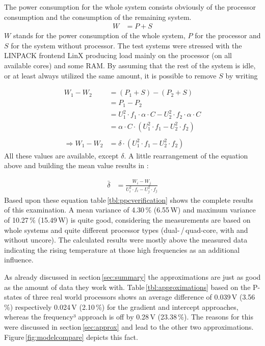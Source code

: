 The power consumption for the whole system consists obviously of the processor consumption and the consumption of the remaining system.
%
\begin{align*}
W &= P + S
\end{align*}
%
$W$ stands for the power consumption of the whole system, $P$ for the processor and $S$ for the system without processor. The test systems were stressed with the LINPACK frontend LinX producing load mainly on the processor (on all available cores) and some RAM. By assuming that the rest of the system is idle, or at least always utilized the same amount, it is possible to remove $S$ by writing

%
\begin{align*}
W_1 - W_2 &= (P_1 + S) - (P_2 + S)\\
			&= P_1 - P_2\\
			&=U_1^2 \cdot f_1 \cdot \alpha \cdot C - U_2^2 \cdot f_2 \cdot \alpha \cdot C\\
			&=\alpha \cdot C \cdot (U_1^2 \cdot f_1 - U_2^2 \cdot f_2)\\
\\
\Rightarrow W_1 - W_2 &= \delta \cdot (U_1^2 \cdot f_1 - U_2^2 \cdot f_2)
\end{align*}
%
All these values are available, except $\delta$. A little rearrangement of the equation above and building the mean value results in \delta:

%
\begin{align*}
\bar{\delta}  &= \frac{W_i - W_j}{U_i^2 \cdot f_i - U_j^2 \cdot f_j}
\end{align*}
%
Based upon these equation table\,\ref{tbl:ppcverification} shows the complete results of this examination. A mean variance of 4.30\,\% (6.55\,W) and maximum variance of 10.27\,\% (15.49\,W) is quite good, considering the measurements are based on whole systems and quite different processor types (dual-\,/\,quad-core, with and without uncore). The calculated results were mostly above the measured data indicating the rising temperature at those high frequencies as an additional influence. 

As already discussed in section\,\ref{sec:summary} the approximations are just as good as the amount of data they work with. Table\,\ref{tbl:approximations} based on the P-states of three real world processors shows an average difference of 0.039\,V (3.56\,\%) respectively 0.024\,V (2.10\,\%) for the gradient and intercept approaches, whereas the frequency³ approach is off by 0.28\,V (23.38\,\%). The reasons for this were discussed in section\,\ref{sec:approx} and lead to the other two approximations. Figure\,\ref{fig:modelcompare} depicts this fact.

